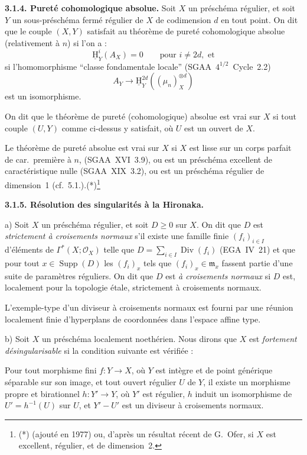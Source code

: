\documentclass[11pt]{article}
\DeclareMathOperator{\Supp}{Supp}
\DeclareMathOperator{\Div}{Div}
\providecommand{\cO}{\mathcal{O}}
\providecommand{\fm}{\mathfrak{m}}
\renewcommand{\H}{\mathrm{H}}
\begin{document}
\textbf{3.1.4. Pureté cohomologique absolue.} Soit $X$ un préschéma régulier, et soit $Y$ un sous-préschéma fermé régulier de $X$ de codimension $d$ en tout point. On dit que le couple $(X,Y)$ satisfait au théorème de pureté cohomologique absolue (relativement à $n$) si l'on a :
\[
\underline{\H}^i_Y(A_X) = 0 \qquad \text{pour } i \neq 2d, \text{ et}
\]
si l'homomorphisme ``classe fondamentale locale'' (SGAA~$4^{1/2}$~Cycle~2.2)
\[
A_Y \longrightarrow \underline{\H}^{2d}_Y((\mu_n)^{\otimes d}_X)
\]
est un isomorphisme.

On dit que le théorème de pureté (cohomologique) absolue est vrai sur $X$ si tout couple $(U,Y)$ comme ci-dessus y satisfait, où $U$ est un ouvert de $X$.

Le théorème de pureté absolue est vrai sur $X$ si $X$ est lisse sur un corps parfait de car.~première à $n$, (SGAA~XVI~3.9), ou est un préschéma excellent de caractéristique nulle (SGAA~XIX~3.2), ou est un préschéma régulier de dimension~1 (cf.~5.1.).(*)\footnote{(*) (ajouté en 1977) ou, d'après un résultat récent de G.~Ofer, si $X$ est excellent, régulier, et de dimension~2.}

\textbf{3.1.5. Résolution des singularités à la Hironaka.}

a) Soit $X$ un préschéma régulier, et soit $D \geqslant 0$ sur $X$. On dit que $D$ est \emph{strictement à croisements normaux} s'il existe une famille finie $(f_i)_{i \in I}$ d'éléments de $\Gamma^{*}(X; \cO_X)$ telle que $D = \sum_{i \in I} \Div(f_i)$ (EGA~IV~21) et que pour tout $x \in \Supp(D)$ les $(f_i)_x$ tels que $(f_i)_x \in \fm_x$ fassent partie d'une suite de paramètres réguliers. On dit que $D$ est \emph{à croisements normaux} si $D$ est, localement pour la topologie étale, strictement à croisements normaux.

L'exemple-type d'un diviseur à croisements normaux est fourni par une réunion localement finie d'hyperplans de coordonnées dans l'espace affine type.

b) Soit $X$ un préschéma localement noethérien. Nous dirons que $X$ est \emph{fortement désingularisable} si la condition suivante est vérifiée :

Pour tout morphisme fini $f : Y \to X$, où $Y$ est intègre et de point générique séparable sur son image, et tout ouvert régulier $U$ de $Y$, il existe un morphisme propre et birationnel $h : Y' \to Y$, où $Y'$ est régulier, $h$ induit un isomorphisme de $U' = h^{-1}(U)$ sur $U$, et $Y' - U'$ est un diviseur à croisements normaux.
\end{document}
